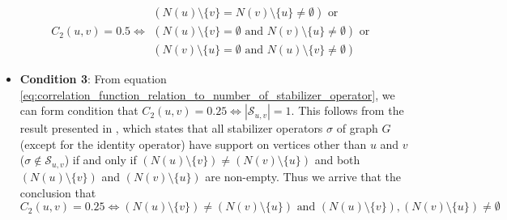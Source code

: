 \documentclass{article}
\begin{document}
\begin{itemize}
    $$C_2(u, v) = 0.5 \iff 
\begin{aligned}(N(u) \setminus \{v\} = N(v) \setminus \{u\} \neq \emptyset) \text{ or } \\
(N(u) \setminus \{v\} = \emptyset \text{ and } N(v) \setminus \{u\} \neq \emptyset) 
\text{ or } \\
(N(v) \setminus \{u\} = \emptyset \text{ and } N(u) \setminus \{v\} \neq \emptyset)
\end{aligned}$$

    
    \item \textbf{Condition 3}: From equation \ref{eq:correlation_function_relation_to_number_of_stabilizer_operator}, we can form condition that $C_2(u, v) = 0.25 \iff |\mathcal{S}_{u,v}| = 1$. This follows from the result presented in \cite{guhne2009entanglement}, which states that all stabilizer operators $\sigma$ of graph $ G $ (except for the identity operator) have support on vertices other than $ u $ and $ v $ ($\sigma \not \in \mathcal{S}_{u, v}$) if and only if $ (N(u) \setminus \{v\}) \neq (N(v) \setminus \{u\}) $ and both $ (N(u) \setminus \{v\}) $ and $ (N(v) \setminus \{u\}) $ are non-empty. Thus we arrive that the conclusion that 
    \begin{equation}
        C_2(u, v) = 0.25 \iff (N(u) \setminus \{v\}) \neq (N(v) \setminus \{u\}) \text{ and } (N(u) \setminus \{v\}), (N(v) \setminus \{u\}) \neq \emptyset
    \end{equation} 
\end{itemize}


\end{document}
